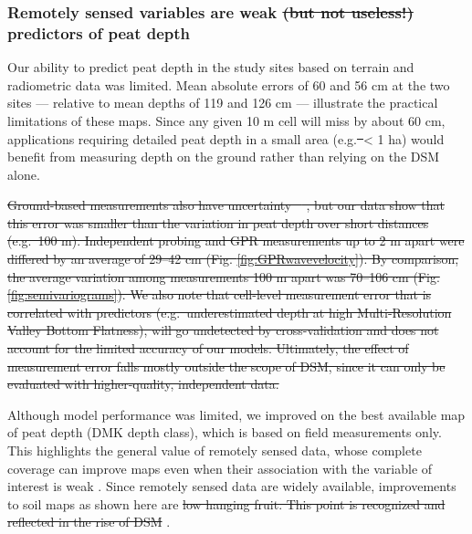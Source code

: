 \documentclass[soil, manuscript]{copernicus}
\providecommand{\DIFadd}[1]{{\protect\color{blue}\uwave{#1}}} %
\providecommand{\DIFdel}[1]{{\protect\color{red}\sout{#1}}}                      %
\providecommand{\DIFaddbegin}{} %
\providecommand{\DIFaddend}{} %
\providecommand{\DIFdelbegin}{} %
\providecommand{\DIFdelend}{} %
\begin{document}
\subsubsection{Remotely sensed variables are weak \DIFdelbegin \DIFdel{(but not useless!) }\DIFdelend predictors of peat depth}

Our ability to predict peat depth in the study sites based on terrain and radiometric data was limited.
Mean absolute errors of 60 and 56 cm at the two sites --- relative to mean depths of 119 and 126 cm --- illustrate the practical limitations of these maps.
Since any given 10 m cell will miss by about 60 cm, applications requiring detailed peat depth in a small area (e.g.\DIFdelbegin \DIFdel{~}\DIFdelend \DIFaddbegin \DIFadd{, }\DIFaddend \textless{} 1 ha) would benefit from measuring depth on the ground rather than relying on the DSM alone.

\DIFdelbegin \DIFdel{Ground-based measurements also have uncertainty \mbox{%
\citep{parryEvaluatingApproachesEstimating2014}}\hskip0pt%
, but our data show that this error was smaller than the variation in peat depth over short distances (e.g.~100 m).
Independent probing and GPR measurements up to 2 m apart were differed by an average of 29--42 cm (Fig. \ref{fig:GPRwavevelocity}).
By comparison, the average variation among measurements 100 m apart was 70--106 cm (Fig. \ref{fig:semivariograms}).
We also note that cell-level measurement error that is correlated with predictors (e.g.~underestimated depth at high Multi-Resolution Valley Bottom Flatness), will go undetected by cross-validation and does not account for the limited accuracy of our models.
Ultimately, the effect of measurement error falls mostly outside the scope of DSM, since it can only be evaluated with higher-quality, independent data.
}%

\DIFdelend Although model performance was limited, we improved on the best available map of peat depth (DMK depth class), which is based on field measurements only.
This highlights the general value of remotely sensed data, whose complete coverage can improve maps even when their association with the variable of interest is weak \citep{mulderUseRemoteSensing2011}.
Since remotely sensed data are widely available, improvements to soil maps as shown here are \DIFdelbegin \DIFdel{low hanging fruit.
This point is recognized and reflected in the rise of DSM }\DIFdelend \DIFaddbegin \DIFadd{readily achievable at low cost }\DIFaddend \citep{minasnyDigitalMappingPeatlands2019}.
\end{document}
